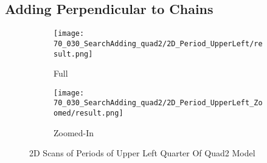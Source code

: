\subsection{Adding Perpendicular to Chains}

\begin{figure}
    \centering
    \begin{subfigure}{0.4\textwidth}
        \centering
        \texttt{[image: 70\_030\_SearchAdding\_quad2/2D\_Period\_UpperLeft/result.png]}
        \caption{Full}
        \label{fig:final.period.whole.full}
    \end{subfigure}
    \begin{subfigure}{0.4\textwidth}
        \centering
        \texttt{[image: 70\_030\_SearchAdding\_quad2/2D\_Period\_UpperLeft\_Zoomed/result.png]}
        \caption{Zoomed-In}
        \label{fig:final.period.whole.halved}
    \end{subfigure}
    \caption{2D Scans of Periods of Upper Left Quarter Of Quad2 Model}
\end{figure}
